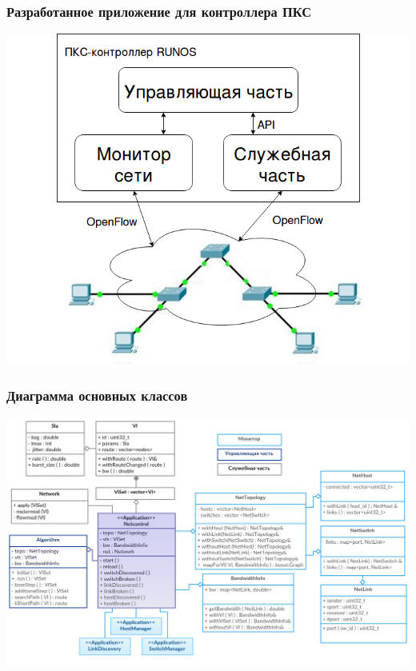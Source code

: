 \documentclass[14pt, handout]{beamer}
\begin{document}
\begin{frame}
\frametitle{Разработанное приложение для контроллера ПКС}

\begin{center}
	\includegraphics[height=0.8\textheight]{img/netcontrol.png}
\end{center}

\end{frame}


\begin{frame}
\frametitle{Диаграмма основных классов}

\begin{center}
	\includegraphics[height=0.78\textheight]{img/classes.png}
\end{center}

\end{frame}
\end{document}
